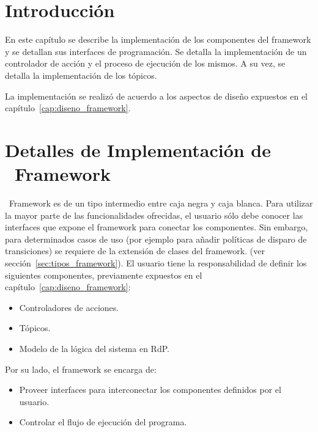 \section{Introducción}
En este capítulo se describe la implementación de los componentes del framework
y se detallan sus interfaces de programación.
Se detalla la implementación de un controlador de acción y el
proceso de ejecución de los mismos. A su vez, se detalla la implementación de
los tópicos.

La implementación se realizó de acuerdo a los aspectos de diseño
expuestos en el capítulo~\ref{cap:diseno_framework}.

\section{Detalles de Implementación de \nombreFramework \ Framework}
\nombreFramework \ Framework es de un tipo intermedio entre caja negra
y caja blanca. Para utilizar la mayor parte de las funcionalidades ofrecidas, el
usuario sólo debe conocer las interfaces que expone el framework para conectar
los componentes. Sin embargo, para determinados casos de uso (por ejemplo para
añadir políticas de disparo de transiciones) se requiere de la extensión de
clases del framework.
(ver sección~\ref{sec:tipos_framework}).
El usuario tiene la responsabilidad de definir los siguientes componentes,
previamente expuestos en el capítulo~\ref{cap:diseno_framework}:
\begin{itemize} 
  \item Controladores de acciones.
  \item Tópicos.
  \item Modelo de la lógica del sistema en RdP.
\end{itemize}

Por su lado, el framework se encarga de:
\begin{itemize} 
  \item Proveer interfaces para interconectar los componentes definidos por el
  usuario.
  \item Controlar el flujo de ejecución del programa.
\end{itemize}

